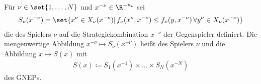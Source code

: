 \begin{definition*}
  Für $\nu \in \set{1, \dots, N}$ und $x^{-\nu} \in \R^{-n_{\nu}}$ sei
  \begin{align*}
    S_{\nu}(x^{-\nu}) = \set{x^{\nu} \in X_{\nu}(x^{-\nu})| \, f_{\nu}(x^{\nu}, x^{-\nu}) \leq f_{\nu}(y, x^{-\nu}) \, \forall y^{\nu} \in X_{\nu}(x^{-\nu})}
  \end{align*}
die  des Spielers $\nu$ auf die Strategiekombination $x^{-\nu}$ der Gegenspieler definiert. Die mengenwertige Abbildung $x^{-\nu} \mapsto S_{\nu}(x^{-\nu})$ heißt  des Spielers $\nu$ und die Abbildung $x \mapsto S(x)$ mit
\begin{align*}
  S(x)\coloneqq S_{1}(x^{-1}) \times \dots \times S_{N}(x^{-N})
\end{align*}
 des GNEPs.
\end{definition*}

